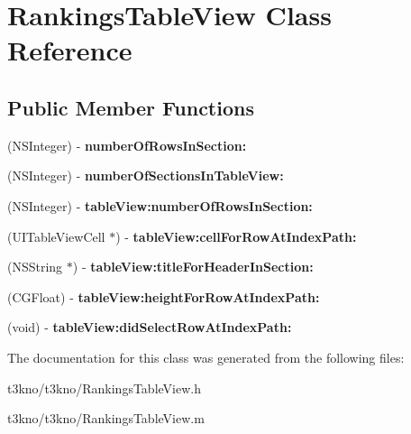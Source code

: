 \hypertarget{interface_rankings_table_view}{\section{Rankings\-Table\-View Class Reference}
\label{interface_rankings_table_view}
}
\subsection*{Public Member Functions}
\begin{DoxyCompactItemize}
\item 
\hypertarget{interface_rankings_table_view_aa8376afea134af9ce128a28634baf685}{(N\-S\-Integer) -\/ {\bfseries number\-Of\-Rows\-In\-Section\-:}}\label{interface_rankings_table_view_aa8376afea134af9ce128a28634baf685}

\item 
\hypertarget{interface_rankings_table_view_af11ac31b268654d3120e06bd1a3c1d99}{(N\-S\-Integer) -\/ {\bfseries number\-Of\-Sections\-In\-Table\-View\-:}}\label{interface_rankings_table_view_af11ac31b268654d3120e06bd1a3c1d99}

\item 
\hypertarget{interface_rankings_table_view_a72e2803587d511df747612eabceb13c3}{(N\-S\-Integer) -\/ {\bfseries table\-View\-:number\-Of\-Rows\-In\-Section\-:}}\label{interface_rankings_table_view_a72e2803587d511df747612eabceb13c3}

\item 
\hypertarget{interface_rankings_table_view_a725ff8e26beb7d78897f62c10b719a0f}{(U\-I\-Table\-View\-Cell $\ast$) -\/ {\bfseries table\-View\-:cell\-For\-Row\-At\-Index\-Path\-:}}\label{interface_rankings_table_view_a725ff8e26beb7d78897f62c10b719a0f}

\item 
\hypertarget{interface_rankings_table_view_a89b14af654eda67b5f8c6eb8797b9563}{(N\-S\-String $\ast$) -\/ {\bfseries table\-View\-:title\-For\-Header\-In\-Section\-:}}\label{interface_rankings_table_view_a89b14af654eda67b5f8c6eb8797b9563}

\item 
\hypertarget{interface_rankings_table_view_a1d778cc91b75c5a4c15177e7fbbc967b}{(C\-G\-Float) -\/ {\bfseries table\-View\-:height\-For\-Row\-At\-Index\-Path\-:}}\label{interface_rankings_table_view_a1d778cc91b75c5a4c15177e7fbbc967b}

\item 
\hypertarget{interface_rankings_table_view_a1b573c8d1ea48a6fe2f0671bb03f597a}{(void) -\/ {\bfseries table\-View\-:did\-Select\-Row\-At\-Index\-Path\-:}}\label{interface_rankings_table_view_a1b573c8d1ea48a6fe2f0671bb03f597a}

\end{DoxyCompactItemize}


The documentation for this class was generated from the following files\-:\begin{DoxyCompactItemize}
\item 
t3kno/t3kno/Rankings\-Table\-View.\-h\item 
t3kno/t3kno/Rankings\-Table\-View.\-m\end{DoxyCompactItemize}
